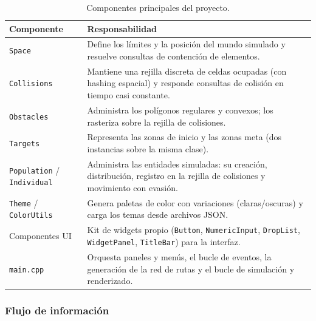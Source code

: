 \documentclass[12pt,a4paper]{article}
\begin{document}
\begin{table}[H]
    \centering
    \caption{Componentes principales del proyecto.}
    \label{tab:componentes}
    \begin{tabularx}{\textwidth}{p{3.5cm} X}
        \toprule
        \textbf{Componente} & \textbf{Responsabilidad} \\
        \midrule

        \texttt{Space} &
        Define los límites y la posición del mundo simulado y resuelve consultas de contención de elementos. \\

        \texttt{Collisions} &
        Mantiene una rejilla discreta de celdas ocupadas (con hashing espacial) y responde consultas de colisión en tiempo casi constante. \\

        \texttt{Obstacles} &
        Administra los polígonos regulares y convexos; los rasteriza sobre la rejilla de colisiones. \\

        \texttt{Targets} &
        Representa las zonas de inicio y las zonas meta (dos instancias sobre la misma clase). \\

        \texttt{Population} / \texttt{Individual} &
        Administra las entidades simuladas: su creación, distribución, registro en la rejilla de colisiones y movimiento con evasión. \\

        \texttt{Theme} / \texttt{ColorUtils} &
        Genera paletas de color con variaciones (claras/oscuras) y carga los temas desde archivos JSON. \\

        Componentes UI &
        Kit de widgets propio (\texttt{Button}, \texttt{NumericInput}, \texttt{DropList}, \texttt{WidgetPanel}, \texttt{TitleBar}) para la interfaz. \\

        \texttt{main.cpp} &
        Orquesta paneles y menús, el bucle de eventos, la generación de la red de rutas y el bucle de simulación y renderizado. \\

        \bottomrule
    \end{tabularx}
\end{table}

\subsubsection{Flujo de información}
\end{document}
